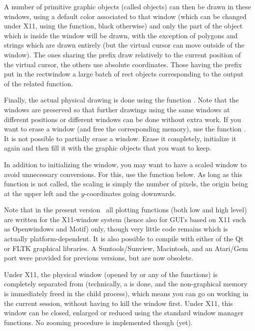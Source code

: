   A number of primitive graphic objects (called  objects) can then
be drawn in these windows, using a default color associated to that window
(which can be changed under X11, using the  function, black
otherwise) and only the part of the object which is inside the window will be
drawn, with the exception of polygons and strings which are drawn entirely
(but the virtual cursor can move outside of the window). The ones sharing the
prefix  draw relatively to the current position of the virtual
cursor, the others use absolute coordinates. Those having the prefix
 put in the rectwindow a large batch of rect objects
corresponding to the output of the related  function.

   Finally, the actual physical drawing is done using the function
. Note that the windows are preserved so that further drawings
using the same windows at different positions or different windows can be
done without extra work. If you want to erase a window (and free the
corresponding memory), use the function . It is not possible to
partially erase a window. Erase it completely, initialize it again and then
fill it with the graphic objects that you want to keep.

   In addition to initializing the window, you may want to have a scaled
window to avoid unnecessary conversions. For this, use the function
 below. As long as this function is not called, the scaling is
simply the number of pixels, the origin being at the upper left and the
$y$-coordinates going downwards.

   Note that in the present version \vers\ all plotting functions (both low
and high level) are written for the X11-window system (hence also for GUI's
based on X11 such as Openwindows and Motif) only, though very little code
remains which is actually platform-dependent. It is also possible to compile
 with either of the Qt or FLTK graphical libraries. A
Suntools/Sunview, Macintosh, and an Atari/Gem port were provided for previous
versions, but are now obsolete.

   Under X11, the physical window (opened by  or any of the
 functions) is completely separated from  (technically, a
 is done, and the non-graphical memory is immediately freed in the
child process), which means you can go on working in the current 
session, without having to kill the window first. Under X11, this window can
be closed, enlarged or reduced using the standard window manager functions.
No zooming procedure is implemented though (yet).

